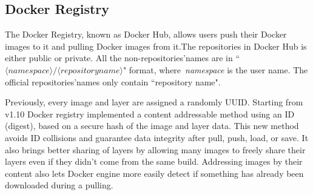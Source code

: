 






\subsection{Docker Registry}

The Docker Registry, known as Docker Hub, allows users push their Docker images to it and pulling Docker images from it.The repositories in Docker Hub is either public or private. All the non-repositories'names are in ``$\langle namespace\rangle/\langle repository name \rangle$" format, where~\textit{namespace} is the user name. The official repositories'names only contain ``repository name".

Previously, every image and layer are assigned a randomly UUID. Starting from v1.10 Docker registry implemented a content addressable method using an ID (digest), based on a secure hash of the image and layer data. This new method avoids ID collisions and guarantee data integrity after pull, push, load, or save. It also brings better sharing of layers by allowing many images to freely share their layers even if they didn't come from the same build. Addressing images by their content also lets Docker engine more easily detect if something has already been downloaded during a pulling. 

